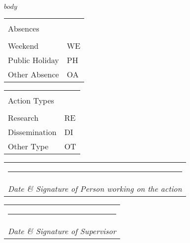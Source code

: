 \documentclass[a4paper]{article}
\makeatletter
\newcommand{\namesigdate}[2][5cm]{
  \begin{tabular}{@{}p{#1}@{}}
    \\[0pt]\hrule \\[0pt]
      {\normalsize \textit{Date \& Signature #2}}
  \end{tabular}
}
\makeatother
\begin{document}
\hspace{0.8cm}
\begin{minipage}{0.7\textwidth}
  \normalsize{
    $body$
  }
\end{minipage}
%
\begin{minipage}[r]{0.2\textwidth}
  \vspace{8.2cm}
  \small{
    \begin{flushright}
      \begin{tabular}{ll}
        \hline\\
        \vspace{0.4pt}
        Absences &    \vspace{0.7pt}\\
        \hline\\
        \vspace{0.5pt}
        Weekend & WE  \\
        Public Holiday & PH   \\
        Other Absence & OA \\
        \hline
      \end{tabular}
    \end{flushright}

    \vspace{10pt}

    \begin{flushright}
      \begin{tabular}{ll}
        \hline\\
        \vspace{0.4pt}
        Action Types &  \vspace{0.7pt}\\
        \hline\\
        \vspace{0.5pt}
        Research & RE \\
        Dissemination & DI  \\
        Other Type & OT\\
        \hline
      \end{tabular}
    \end{flushright}
  }
\end{minipage}



\vfill

\noindent \namesigdate[8cm]{of Person working on the action} \hfill \namesigdate[6cm]{of Supervisor}
\end{document}
